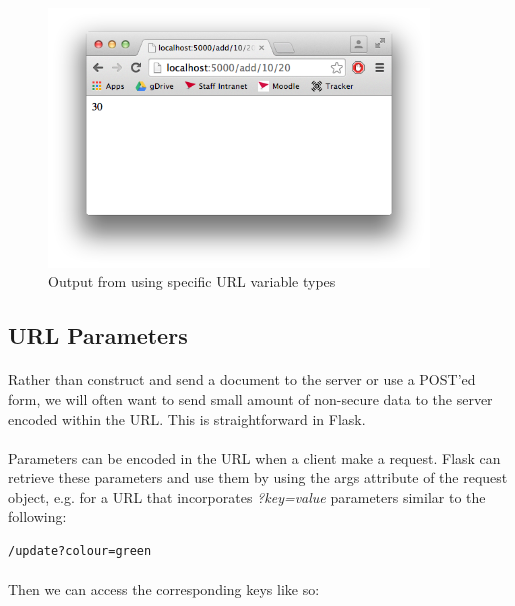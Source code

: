 \documentclass[12pt, a4paper, twoside]{book}
\begin{document}
\begin{figure}[H]
\centering
\includegraphics[width=0.9\textwidth]{images/flask-url-variables-ints.png}
\caption{Output from using specific URL variable types}
\label{fig:flask-url-variables-ints}
\end{figure}



\subsection{URL Parameters}
\label{url-parameters}
\paragraph{} Rather than construct and send a document to the server or use a POST'ed form, we will often want to send small amount of non-secure data to the server encoded within the URL. This is straightforward in Flask. 

\paragraph{} Parameters can be encoded in the URL when a client make a request. Flask can retrieve these parameters and use them by using the args attribute of the request object, e.g. for a URL that incorporates \emph{?key=value} parameters similar to the following:

\begin{lstlisting}[style=DOS]
/update?colour=green
\end{lstlisting}

\paragraph{} Then we can access the corresponding keys like so:
\end{document}
